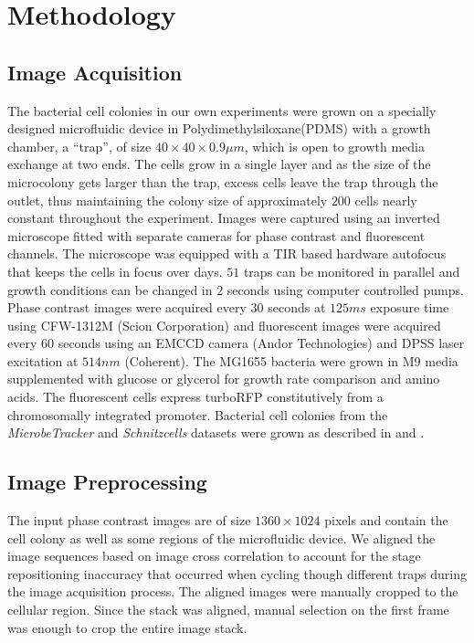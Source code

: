 \documentclass[journal]{IEEEtran}
\begin{document}
\section{Methodology}
\subsection{Image Acquisition}
The bacterial cell colonies in our own experiments were grown on a specially designed microfluidic device in Polydimethylsiloxane(PDMS)\cite {ullmanhigh2012} with a growth chamber, a “trap”, of size $40 \times 40 \times 0.9\mu m$, which is open to growth media exchange at two ends.  The cells grow in a single layer and as the size of the microcolony gets larger than the trap, excess cells leave the trap through the outlet, thus maintaining the colony size of approximately $200$ cells nearly constant throughout the experiment. Images were captured using an inverted microscope fitted with separate cameras for phase contrast and fluorescent channels. The microscope was equipped with a TIR based hardware autofocus that keeps the cells in focus over days. $51$ traps can be monitored in parallel and growth conditions can be changed in $2$ seconds \cite{hammarlac2012} using computer controlled pumps. Phase contrast images were acquired every $30$ seconds at $125 ms$ exposure time using CFW-1312M (Scion Corporation) and fluorescent images were acquired every $60$ seconds using an EMCCD camera (Andor Technologies) and DPSS laser excitation at $514 nm$ (Coherent). The MG1655 bacteria were grown in M9 media supplemented with glucose or glycerol for growth rate comparison and amino acids. The fluorescent cells express turboRFP constitutively from a chromosomally integrated promoter. Bacterial cell colonies from the \textit{MicrobeTracker} and \textit{Schnitzcells} datasets were grown as described in \cite {sliusarenkohigh2011} and \cite {youngmeasuring2012}.

\subsection{Image Preprocessing }
The input phase contrast images are of size $1360 \times 1024$ pixels and contain the cell colony as well as some regions of the microfluidic device. We aligned the image sequences based on image cross correlation to account for the stage repositioning inaccuracy that occurred when cycling though different traps during the image acquisition process. The aligned images were manually cropped to the cellular region. Since the stack was aligned, manual selection on the first frame was enough to crop the entire image stack.
\end{document}

